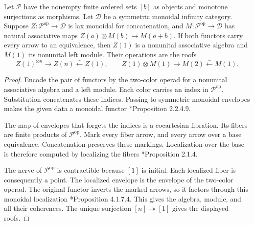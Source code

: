 \begin{lemma}\label{cbc:rc:tower-localization}
Let $\mathcal P$ have the nonempty finite ordered sets $[b]$ as
objects and monotone surjections as morphisms. Let $\mathcal D$
be a symmetric monoidal infinity category. Suppose
$Z:\mathcal P^{\mathrm{op}}\to\mathcal D$ is lax monoidal for
concatenation, and $M:\mathcal P^{\mathrm{op}}\to\mathcal D$
has natural associative maps $Z(a)\otimes M(b)\to M(a+b)$.
If both functors carry every arrow to an equivalence, then
$Z(1)$ is a nonunital associative algebra and $M(1)$ its
nonunital left module. Their operations are the roofs
\[
 Z(1)^{\otimes n}\longrightarrow Z(n)\xleftarrow{\sim}Z(1),
 \qquad Z(1)\otimes M(1)\longrightarrow M(2)\xleftarrow{\sim}M(1).
\]
\end{lemma}
\begin{proof}
Encode the pair of functors by the two-color operad for a
nonunital associative algebra and a left module. Each color carries
an index in $\mathcal P^{\mathrm{op}}$. Substitution
concatenates these indices. Passing to symmetric monoidal
envelopes makes the given data a monoidal functor
\cite{LurieHA}*{Proposition 2.2.4.9}.

The map of envelopes that forgets the indices is a cocartesian
fibration. Its fibers are finite products of
$\mathcal P^{\mathrm{op}}$. Mark every fiber arrow, and every
arrow over a base equivalence. Concatenation preserves these
markings. Localization over the base is therefore computed by
localizing the fibers
\cite{Hinich2016Localization}*{Proposition 2.1.4}.

The nerve of $\mathcal P^{\mathrm{op}}$ is contractible because
$[1]$ is initial. Each localized fiber is consequently a point.
The localized envelope is the envelope of the two-color operad.
The original functor inverts the marked arrows, so it factors
through this monoidal localization
\cite{LurieHA}*{Proposition 4.1.7.4}. This gives the algebra,
module, and all their coherences. The unique surjection
$[n]\twoheadrightarrow[1]$ gives the displayed roofs.
\end{proof}

